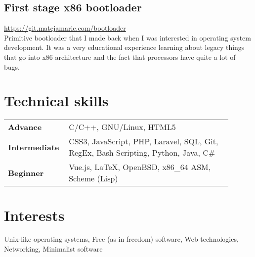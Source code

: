 \documentclass[12pt]{article}
\begin{document}
\subsection{First stage x86 bootloader}
\hfill\url{https://git.matejamaric.com/bootloader}\\
Primitive bootloader that I made back when I was interested in operating system development. 
It was a very educational experience learning about legacy things that go into x86 architecture and 
the fact that processors have quite a lot of bugs.

\section{Technical skills}
\begin{tabular}{ @{} p{0.2\linewidth} p{0.7\linewidth} }
\large\textbf{Advance}       & \normalsize C/C++, GNU/Linux, HTML5\\
\large\textbf{Intermediate}  & \normalsize CSS3, JavaScript, PHP, Laravel, SQL, Git, RegEx, Bash Scripting, Python, Java, C\#\\
\large\textbf{Beginner}      & \normalsize Vue.js, \LaTeX, OpenBSD, x86\_64 ASM, Scheme (Lisp)
\end{tabular}

\section{Interests}
Unix-like operating systems, Free (as in freedom) software, Web technologies, Networking, Minimalist software
\end{document}
